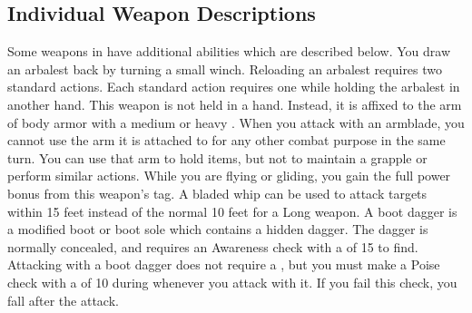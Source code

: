   \subsection{Individual Weapon Descriptions}\label{Individual Weapon Descriptions}
    Some weapons in  have additional abilities which are described below.
     You draw an arbalest back by turning a small winch. Reloading an arbalest requires two standard actions.
    Each standard action requires one  while holding the arbalest in another hand.
     This weapon is not held in a hand.
    Instead, it is affixed to the arm of body armor with a medium or heavy .
    When you attack with an armblade, you cannot use the arm it is attached to for any other combat purpose in the same turn.
    You can use that arm to hold items, but not to maintain a grapple or perform similar actions.
     While you are flying or gliding, you gain the full power bonus from this weapon's  tag.
     A bladed whip can be used to attack targets within 15 feet instead of the normal 10 feet for a Long weapon.
     A boot dagger is a modified boot or boot sole which contains a hidden dagger.
    The dagger is normally concealed, and requires an Awareness check with a  of 15 to find.
    Attacking with a boot dagger does not require a , but you must make a Poise check with a  of 10 during whenever you attack with it.
    If you fail this check, you fall \prone after the attack.

